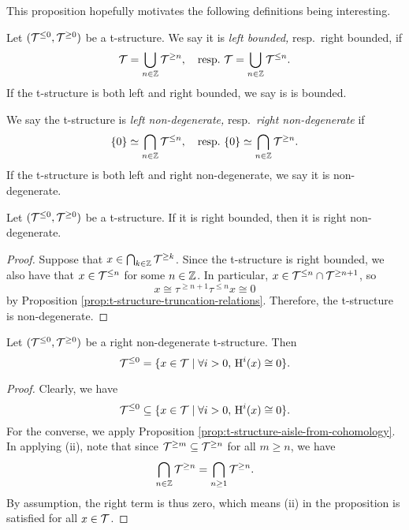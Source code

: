 This proposition hopefully motivates the following definitions being interesting.

\begin{definition}
	Let \((\mathcal{T}^{\leq 0},\mathcal{T}^{\geq 0})\) be a t-structure. We say it is \emph{left bounded,} resp.\ right bounded, if
	\[ \mathcal{T} = \bigcup_{n\in\mathbb{Z}}\mathcal{T}^{\geq n},\quad \text{resp.\ } \mathcal{T} = \bigcup_{n\in\mathbb{Z}}\mathcal{T}^{\leq n}. \]
	If the t-structure is both left and right bounded, we say is is bounded.

	We say the t-structure is \emph{left non-degenerate,} resp.\ \emph{right non-degenerate} if
	\[ \{0\} \simeq \bigcap_{n\in\mathbb{Z}}\mathcal{T}^{\leq n},\quad \text{resp.\ } \{0\} \simeq \bigcap_{n\in\mathbb{Z}}\mathcal{T}^{\geq n}. \]
	If the t-structure is both left and right non-degenerate, we say it is non-degenerate.
\end{definition}

\begin{proposition}
	Let \((\mathcal{T}^{\leq 0},\mathcal{T}^{\geq 0})\) be a t-structure. If it is right bounded, then it is right non-degenerate.
\end{proposition}
\begin{proof}
Suppose that \(x\in\bigcap_{k\in\mathbb{Z}}\mathcal{T}^{\geq k}\). Since the t-structure is right bounded, we also have that \(x\in\mathcal{T}^{\leq n}\) for some \(n\in\mathbb{Z}\).
In particular, \(x\in\mathcal{T}^{\leq n}\cap\mathcal{T}^{\geq n+1}\), so
\[ x \cong \tau^{\geq n+1}\tau^{\leq n}x \cong 0 \]
by Proposition \ref{prop:t-structure-truncation-relations}. Therefore, the t-structure is non-degenerate.
\end{proof}

\begin{corollary}\label{corollary:t-structure-right-non-degenerate-aisle-from-cohomology}
	Let \((\mathcal{T}^{\leq 0},\mathcal{T}^{\geq 0})\) be a right non-degenerate t-structure. Then
	\[ \mathcal{T}^{\leq 0} = \{ x\in\mathcal{T} \mid \forall i>0,\, \operatorname{H}^i(x) \cong 0 \}. \]
\end{corollary}
\begin{proof}
Clearly, we have
\[ \mathcal{T}^{\leq 0} \subseteq \{ x\in\mathcal{T} \mid \forall i>0,\, \operatorname{H}^i(x) \cong 0 \}. \]
For the converse, we apply Proposition \ref{prop:t-structure-aisle-from-cohomology}. In applying (ii), note that since \(\mathcal{T}^{\geq m}\subseteq\mathcal{T}^{\geq n}\) for all \(m\geq n\), we have
\[ \bigcap_{n\in\mathbb{Z}}\mathcal{T}^{\geq n} = \bigcap_{n\geq 1}\mathcal{T}^{\geq n}. \]
By assumption, the right term is thus zero, which means (ii) in the proposition is satisfied for all \(x\in\mathcal{T}\).
\end{proof}

